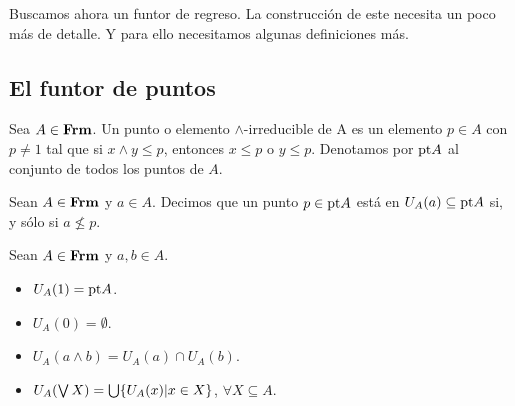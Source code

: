 \documentclass{comunicaciones}
\begin{document}
Buscamos ahora un funtor de regreso. La construcción de este necesita un poco más de detalle. Y para ello necesitamos algunas definiciones más.

\subsection{El funtor de puntos}

\begin{dfn}
  Sea $A\in \mathbf{Frm}$. Un punto o elemento $\wedge$-irreducible 
  de A es un elemento $p\in A$ con $p\neq 1$ tal que si 
  $x\wedge y\leq p$, entonces $x\leq p$ o $y\leq p$. 
  Denotamos por $\mathrm{pt} A$ al conjunto de todos los puntos de $A$.
\end{dfn}

Sean $A\in \mathbf{Frm}$ y $a\in A$. Decimos que un punto $p\in \mathrm{pt} A$ está en $U_A(a)\subseteq \mathrm{pt} A$ si, y sólo si $a\not\leq p$.
\begin{lem}
  Sean $A\in \mathbf{Frm}$ y $a,b\in A$.
  \begin{itemize}
      \item $U_A(1)=\mathrm{pt} A$.
      \item $U_A(0)=\emptyset$.
      \item $U_A(a\wedge b)=U_A(a)\cap U_A(b)$.
      \item $U_A(\bigvee X)=\bigcup \{U_A(x)|x\in X\}$, $\forall X\subseteq A$.
  \end{itemize}
\end{lem}
\end{document}
